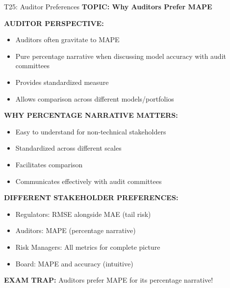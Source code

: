 \documentclass[8pt]{beamer}
\begin{document}
	\begin{frame}{T25: Auditor Preferences}
		\fontsize{6.5}{7.5}\selectfont
		\textbf{TOPIC: Why Auditors Prefer MAPE}
		
		\vspace{0.1cm}
		\textbf{AUDITOR PERSPECTIVE:}
		\begin{itemize}
			\item Auditors often gravitate to MAPE
			\item Pure percentage narrative when discussing model accuracy with audit committees
			\item Provides standardized measure
			\item Allows comparison across different models/portfolios
		\end{itemize}
		
		\vspace{0.1cm}
		\textbf{WHY PERCENTAGE NARRATIVE MATTERS:}
		\begin{itemize}
			\item Easy to understand for non-technical stakeholders
			\item Standardized across different scales
			\item Facilitates comparison
			\item Communicates effectively with audit committees
		\end{itemize}
		
		\vspace{0.1cm}
		\textbf{DIFFERENT STAKEHOLDER PREFERENCES:}
		\begin{itemize}
			\item \textcolor{myblue}{Regulators:} RMSE alongside MAE (tail risk)
			\item \textcolor{myblue}{Auditors:} MAPE (percentage narrative)
			\item \textcolor{myblue}{Risk Managers:} All metrics for complete picture
			\item \textcolor{myblue}{Board:} MAPE and accuracy (intuitive)
		\end{itemize}
		
		\textcolor{myred}{\textbf{EXAM TRAP:}} Auditors prefer MAPE for its \textcolor{myblue}{percentage narrative}!
	\end{frame}
	
	
\end{document}
